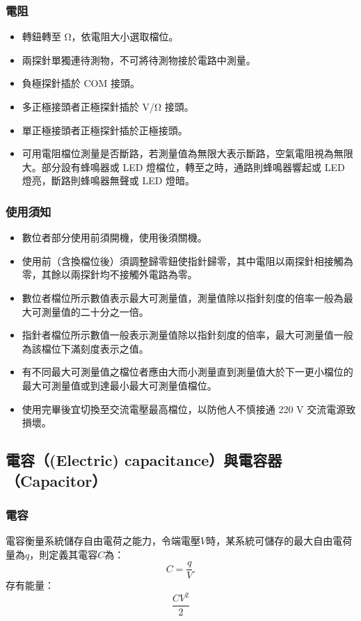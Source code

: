 \documentclass[a4paper,12pt]{report}
\begin{document}
\begin{itemize}
\subsubsection{電阻}
\begin{itemize}
\item 轉鈕轉至 Ω，依電阻大小選取檔位。
\item 兩探針單獨連待測物，不可將待測物接於電路中測量。
\item 負極探針插於 COM 接頭。
\item 多正極接頭者正極探針插於 V/Ω 接頭。
\item 單正極接頭者正極探針插於正極接頭。
\item 可用電阻檔位測量是否斷路，若測量值為無限大表示斷路，空氣電阻視為無限大。部分設有蜂鳴器或 LED 燈檔位，轉至之時，通路則蜂鳴器響起或 LED 燈亮，斷路則蜂鳴器無聲或 LED 燈暗。
\end{itemize}
\subsubsection{使用須知}
\begin{itemize}
\item 數位者部分使用前須開機，使用後須關機。
\item 使用前（含換檔位後）須調整歸零鈕使指針歸零，其中電阻以兩探針相接觸為零，其餘以兩探針均不接觸外電路為零。
\item 數位者檔位所示數值表示最大可測量值，測量值除以指針刻度的倍率一般為最大可測量值的二十分之一倍。
\item 指針者檔位所示數值一般表示測量值除以指針刻度的倍率，最大可測量值一般為該檔位下滿刻度表示之值。
\item 有不同最大可測量值之檔位者應由大而小測量直到測量值大於下一更小檔位的最大可測量值或到達最小最大可測量值檔位。
\item 使用完畢後宜切換至交流電壓最高檔位，以防他人不慎接通 220 V 交流電源致損壞。
\end{itemize}
\subsection{電容（(Electric) capacitance）與電容器（Capacitor）}
\subsubsection{電容}
電容衡量系統儲存自由電荷之能力，令端電壓$V$時，某系統可儲存的最大自由電荷量為$q$，則定義其電容$C$為：
\[C=\frac{q}{V}.\]
存有能量：
\[\frac{CV^2}{2}\]

\end{itemize}
\end{document}
